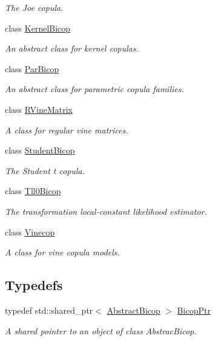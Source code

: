 \begin{DoxyCompactItemize}
\begin{DoxyCompactList}\small\item\em The Joe copula. \end{DoxyCompactList}\item 
class \hyperlink{classvinecopulib_1_1_kernel_bicop}{Kernel\+Bicop}
\begin{DoxyCompactList}\small\item\em An abstract class for kernel copulas. \end{DoxyCompactList}\item 
class \hyperlink{classvinecopulib_1_1_par_bicop}{Par\+Bicop}
\begin{DoxyCompactList}\small\item\em An abstract class for parametric copula families. \end{DoxyCompactList}\item 
class \hyperlink{classvinecopulib_1_1_r_vine_matrix}{R\+Vine\+Matrix}
\begin{DoxyCompactList}\small\item\em A class for regular vine matrices. \end{DoxyCompactList}\item 
class \hyperlink{classvinecopulib_1_1_student_bicop}{Student\+Bicop}
\begin{DoxyCompactList}\small\item\em The Student t copula. \end{DoxyCompactList}\item 
class \hyperlink{classvinecopulib_1_1_tll0_bicop}{Tll0\+Bicop}
\begin{DoxyCompactList}\small\item\em The transformation local-\/constant likelihood estimator. \end{DoxyCompactList}\item 
class \hyperlink{classvinecopulib_1_1_vinecop}{Vinecop}
\begin{DoxyCompactList}\small\item\em A class for vine copula models. \end{DoxyCompactList}\end{DoxyCompactItemize}
\subsection*{Typedefs}
\begin{DoxyCompactItemize}
\item 
typedef std\+::shared\+\_\+ptr$<$ \hyperlink{classvinecopulib_1_1_abstract_bicop}{Abstract\+Bicop} $>$ \hyperlink{namespacevinecopulib_afd73d02952b845883499cbbda1996204}{Bicop\+Ptr}\hypertarget{namespacevinecopulib_afd73d02952b845883499cbbda1996204}{}\label{namespacevinecopulib_afd73d02952b845883499cbbda1996204}

\begin{DoxyCompactList}\small\item\em A shared pointer to an object of class Abstrac\+Bicop. \end{DoxyCompactList}\end{DoxyCompactItemize}
